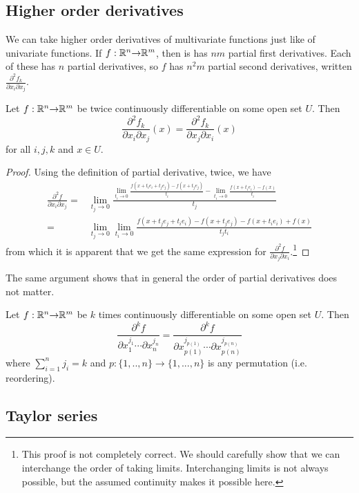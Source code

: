 \subsection{Higher order derivatives}
We can take higher order derivatives of multivariate functions just
like of univariate functions. If $f: \mathbb{R}^n {\rightarrow} \mathbb{R}^m$, then is has $nm$
partial first derivatives. Each of these has $n$ partial derivatives,
so $f$ has $n^2m$ partial second derivatives, written
$\frac{\partial^2 f_k}{\partial x_i \partial x_j}$. 
\begin{theorem}
  Let $f: \mathbb{R}^n {\rightarrow} \mathbb{R}^m$ be twice continuously differentiable on some
  open set $U$. Then
  \[ \frac{\partial^2 f_k}{\partial x_i \partial
    x_j}(x) =  \frac{\partial^2 f_k}{\partial x_j \partial
    x_i} (x) \]
  for all $i,j,k$ and $ x \in U$.
\end{theorem}
\begin{proof}
  Using the definition of partial derivative, twice, we have
  \begin{align*}
    \frac{\partial^2 f}{\partial x_i \partial x_j} = & \lim_{t_j \to 0}
    \frac{ \lim_{t_i \to 0} \frac{ f(x + t_i e_i + t_j e_j) - f(x +
        t_j e_j)}{t_i} - \lim_{t_i \to 0} \frac{ f(x + t_i e_i) -
        f(x)}{t_i} }{t_j} \\
    = & \lim_{t_j \to 0} \lim_{t_i \to 0} \frac{f(x+t_je_j + t_i e_i)
      - f(x + t_j e_j) - f(x + t_i e_i) + f(x)} {t_j t_i}
  \end{align*}
  from which it is apparent that we get the same expression for $
  \frac{\partial^2 f}{\partial x_j \partial x_i} $.\footnote{This
    proof is not completely correct. We should carefully show that we
    can interchange the order of taking limits. Interchanging limits
    is not always possible, but the assumed continuity makes it
    possible here.}
\end{proof}
The same argument shows that in general the order of partial
derivatives does not matter.
\begin{corollary}
  Let $f: \mathbb{R}^n {\rightarrow} \mathbb{R}^m$ be $k$ times continuously differentiable on
  some open set $U$. Then 
  \[ \frac{\partial^k f}{\partial x_1^{j_1} \cdots
     \partial x_n^{j_n}} = 
  \frac{\partial^k f}{\partial x_{p(1)}^{j_{p(1)}}  \cdots \partial
    x_{p(n)}^{j_{p(n)}}} \]
  where $\sum_{i=1}^n j_i = k$ and $p:\{1,..,n\} \to \{1,...,n\}$ is
  any permutation (i.e. reordering).
\end{corollary}

\subsection{Taylor series}

